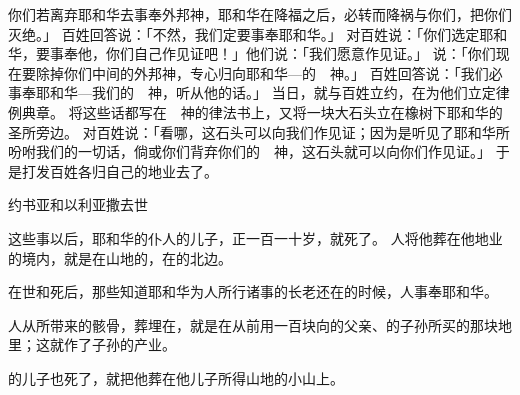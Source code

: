 {你们若离弃耶和华去事奉外邦神，耶和华在降福之后，必转而降祸与你们，把你们灭绝。」
百姓回答{}说：「不然，我们定要事奉耶和华。」
对百姓说：「你们选定耶和华，要事奉他，你们自己作见证吧！」他们说：「我们愿意作见证。」
说：「你们现在要除掉你们中间的外邦神，专心归向耶和华—{}的　神。」
百姓回答{}说：「我们必事奉耶和华—我们的　神，听从他的话。」
当日，{}就与百姓立约，在{}为他们立定律例典章。
将这些话都写在　神的律法书上，又将一块大石头立在橡树下耶和华的圣所旁边。
对百姓说：「看哪，这石头可以向我们作见证；因为是听见了耶和华所吩咐我们的一切话，倘或你们背弃你们的　神，这石头就可以向你们作见证。」
于是{}打发百姓各归自己的地业去了。
\par }{\SH 约书亚和以利亚撒去世
\par }{\PP {}这些事以后，耶和华的仆人{}的儿子{}，正一百一十岁，就死了。
人将他葬在他地业的境内，就是在{}山地的{}，在{}的北边。
\par }{\PP {}在世和{}死后，那些知道耶和华为{}人所行诸事的长老还在的时候，{}人事奉耶和华。
\par }{\PP {}人从{}所带来{}的骸骨，葬埋在{}，就是在{}从前用一百块{}向{}的父亲、{}的子孙所买的那块地里；这就作了{}子孙的产业。
\par }{\PP {}的儿子{}也死了，就把他葬在他儿子{}所得{}山地的小山上。
\par }